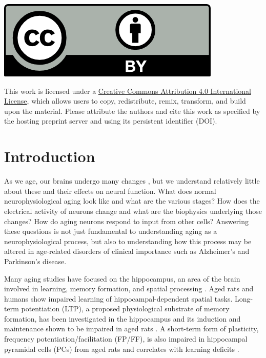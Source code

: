 \documentclass[12pt]{article}
\begin{document}
\vspace{2cm}

\begin{minipage}{0.2\textwidth}
\includegraphics[width=0.8\textwidth]{figures/ccby.png}
\end{minipage}%
\begin{minipage}{0.75\textwidth}
\begin{scriptsize}
This work is licensed under a \href{https://creativecommons.org/licenses/by/4.0/}{Creative Commons Attribution 4.0 International License}, which allows users to copy, redistribute, remix, transform, and build upon the material. Please attribute the authors and cite this work as specified by the hosting preprint server and using its persistent identifier (DOI).
\end{scriptsize}
\end{minipage}

\newpage

\linenumbers

\section{Introduction}
As we age, our brains undergo many changes
\citep{oh2010learning,rizzo2015dissecting,rosenzweig2003impact}, but we understand relatively little about these and their effects on neural function. What does
normal neurophysiological aging look like and what are the various stages? How does the electrical activity of neurons change and what are the biophysics underlying those changes?  How do
aging neurons respond to input from other cells? Answering these questions is not
just fundamental to understanding aging as a neurophysiological process, but also to understanding how this process may be altered in age-related disorders of clinical importance such as Alzheimer's \cite{fjell2014normal} and Parkinson's \cite{rodriguez2015parkinson} disease.

Many aging studies have focused on the hippocampus, an area of the brain involved in learning, memory formation, and spatial processing
\citep{oh2010learning,rizzo2015dissecting,rosenzweig2003impact}. Aged rats \citep{barnes1979memory,barnes1985age,barnes1997age,gage1984spatial,barnes1980spatial,caprioli1991spatial} and humans \citep{newman2000spatial,wilkniss1997age} show impaired learning of hippocampal-dependent spatial tasks. Long-term potentiation (LTP), a proposed physiological substrate of memory formation, has been investigated in the hippocampus and its induction and maintenance
shown to be impaired in aged rats
\citep{barnes1979memory,barnes1980spatial,deupree1993age,rosenzweig1997role}. A short-term form of plasticity, frequency potentiation/facilitation
(FP/FF), is also impaired in hippocampal pyramidal cells (PCs) from aged rats and correlates
with learning deficits
\citep{landfield1977impaired,landfield1978impaired}.
\end{document}
